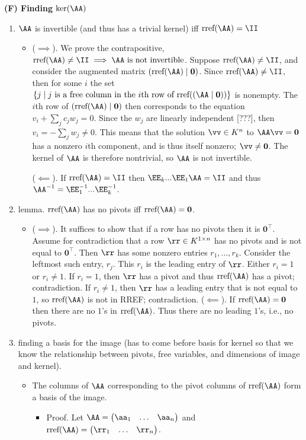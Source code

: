 \textbf{(F) Finding $\ker(\AA)$}
\begin{enumerate}    
    \item $\AA$ is invertible (and thus has a trivial kernel) iff $\rref(\AA) = \II$
    \begin{itemize}
        \item    
        ($\implies$). We prove the contrapositive, $\rref(\AA) \neq \II \implies \text{$\AA$ is not invertible}$. Suppose $\rref(\AA) \neq \II$, and consider the augmented matrix $(\rref(\AA) \mid \mathbf{0})$. Since $\rref(\AA) \neq \II$, then for some $i$ the set $\{j \mid \text{$j$ is a free column in the $i$th row of $\rref((\AA \mid \mathbf{0}))$}\}$ is nonempty. The $i$th row of $(\rref(\AA) \mid \mathbf{0})$ then corresponds to the equation $v_i + \sum_j c_j w_j = 0$. Since the $w_j$ are linearly independent [???], then $v_i = -\sum_j w_j \neq 0$. This means that the solution $\vv \in K^n$ to $\AA \vv = \mathbf{0}$ has a nonzero $i$th component, and is thus itself nonzero; $\vv \neq \mathbf{0}$. The kernel of $\AA$ is therefore nontrivial, so $\AA$ is not invertible. 

        ($\impliedby$). If $\rref(\AA) = \II$ then $\EE_k ... \EE_1 \AA = \II$ and thus $\AA^{-1} = \EE_1^{-1} ... \EE_k^{-1}$.
    \end{itemize}
    \item lemma. $\rref(\AA)$ has no pivots iff $\rref(\AA) = \mathbf{0}$.
    \begin{itemize}
        \item ($\implies$). It suffices to show that if a row has no pivots then it is $\mathbf{0}^\top$. Assume for contradiction that a row $\rr \in K^{1 \times n}$ has no pivots and is not equal to $\mathbf{0}^\top$. Then $\rr$ has some nonzero entries $r_1, ..., r_k$. Consider the leftmost such entry, $r_j$. This $r_i$ is the leading entry of $\rr$. Either $r_i = 1$ or $r_i \neq 1$. If $r_i = 1$, then $\rr$ has a pivot and thus $\rref(\AA)$ has a pivot; contradiction. If $r_i \neq 1$, then $\rr$ has a leading entry that is not equal to $1$, so $\rref(\AA)$ is not in RREF; contradiction. 
        ($\impliedby$). If $\rref(\AA) = \mathbf{0}$ then there are no $1$'s in $\rref(\AA)$. Thus there are no leading $1$'s, i.e., no pivots.
    \end{itemize}
    \item finding a basis for the image (has to come before basis for kernel so that we know the relationship between pivots, free variables, and dimensions of image and kernel).
    \begin{itemize}
        \item The columns of $\AA$ corresponding to the pivot columns of $\rref(\AA)$ form a basis of the image.
        \begin{itemize}
            \item Proof. Let $\AA = \begin{pmatrix} \aa_1 & \hdots & \aa_n \end{pmatrix}$ and $\rref(\AA) = \begin{pmatrix} \rr_1 & \hdots & \rr_n \end{pmatrix}$.
            

\end{itemize}
\end{itemize}
\end{enumerate}
